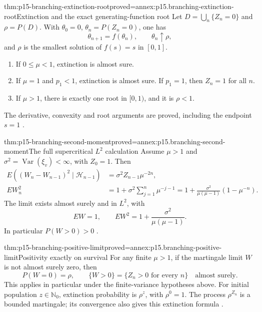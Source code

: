 \begin{hbtheorem}{thm:p15-branching-extinction-root}{proved=annex:p15.branching-extinction-root}{Extinction and the exact generating-function root}
Let \(D=\bigcup_n\{Z_n=0\}\) and \(\rho=P(D)\).
With \(\theta_0=0\), \(\theta_n=P(Z_n=0)\), one has
\[
                 \theta_{n+1}=f(\theta_n),\qquad
                 \theta_n\uparrow\rho,
\]
and \(\rho\) is the smallest solution of \(f(s)=s\) in \([0,1]\).
\begin{enumerate}
\item If \(0\leq\mu<1\), extinction is almost sure.
\item If \(\mu=1\) and \(p_1<1\), extinction is almost sure.
      If \(p_1=1\), then \(Z_n=1\) for all \(n\).
\item If \(\mu>1\), there is exactly one root in \([0,1)\),
      and it is \(\rho<1\).
\end{enumerate}
The derivative, convexity and root arguments are proved, including
the endpoint \(s=1\)
\cite[thms.~4.3.10--12]{DurrettPTEAuthor2019}.
\end{hbtheorem}

\begin{hbtheorem}{thm:p15-branching-second-moment}{proved=annex:p15.branching-second-moment}{The full supercritical \(L^2\) calculation}
Assume \(\mu>1\) and
\(\sigma^2=\operatorname{Var}(\xi_v)<\infty\), with \(Z_0=1\).
Then
\[
 \begin{split}
 E((W_n-W_{n-1})^2\mid\mathcal H_{n-1})
                         &=\sigma^2Z_{n-1}\mu^{-2n},\\
 EW_n^2&=1+\sigma^2\sum_{j=1}^n\mu^{-j-1}
        =1+\frac{\sigma^2}{\mu(\mu-1)}(1-\mu^{-n}).
 \end{split}
\]
The limit exists almost surely and in \(L^2\), with
\[
                    EW=1,\qquad
                    EW^2=1+\frac{\sigma^2}{\mu(\mu-1)}.
\]
In particular \(P(W>0)>0\)
\cite[ex.~4.4.9]{DurrettPTEAuthor2019}.
\end{hbtheorem}

\begin{hbtheorem}{thm:p15-branching-positive-limit}{proved=annex:p15.branching-positive-limit}{Positivity exactly on survival}
For any finite \(\mu>1\), if the martingale limit \(W\) is not
almost surely zero, then
\[
                 P(W=0)=\rho,\qquad
                 \{W>0\}=\{Z_n>0\text{ for every }n\}
                                      \quad\text{almost surely}.
\]
This applies in particular under the finite-variance hypotheses above.
For initial population \(z\in\mathbb N_0\), extinction probability is
\(\rho^z\), with \(\rho^0=1\). The process \(\rho^{Z_n}\) is a
bounded martingale; its convergence also gives this extinction formula
\cite[exs.~4.3.11--12]{DurrettPTEAuthor2019}.
\end{hbtheorem}


